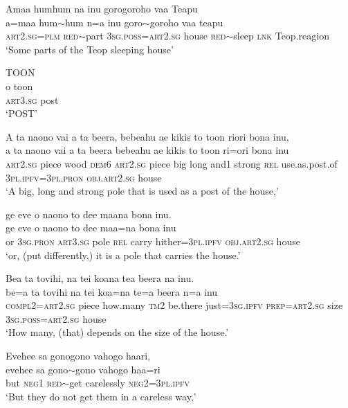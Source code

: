 \ea\label{ex:text11-1}
Amaa humhum na inu gorogoroho vaa Teapu\\
\gll a=maa	hum{$\sim$}hum	n=a	inu	goro{$\sim$}goroho	vaa	teapu\\
     \textsc{art}2.\textsc{sg}=\textsc{plm}	\textsc{red}{$\sim$}part	3\textsc{sg}.\textsc{poss}=\textsc{art}2.\textsc{sg}	house	\textsc{red}{$\sim$}sleep	\textsc{lnk}	Teop.reagion\\
\glt `Some parts of the Teop sleeping house'
\z

\ea\label{ex:text11-2}
TOON\\
\gll o	toon\\
     \textsc{art}3.\textsc{sg}	post\\
\glt `POST'
\z

\ea\label{ex:text11-3}
A ta naono vai a ta beera, bebeahu ae kikis to toon riori bona inu,\\
\gll a	ta	naono	vai	a	ta	beera	bebeahu	ae	kikis	to	toon	ri=ori	bona	inu\\
     \textsc{art}2.\textsc{sg}	piece	wood	\textsc{dem}6	\textsc{art}2.\textsc{sg}	piece	big	long	and1	strong	\textsc{rel}	use.as.post.of	3\textsc{pl}.\textsc{ipfv}=3\textsc{pl}.\textsc{pron}	\textsc{obj}.\textsc{art}2.\textsc{sg}	house\\
\glt `A big, long and strong pole that is used as a post of the house,'
\z

\ea\label{ex:text11-4}
ge eve o naono to dee maana bona inu.\\
\gll ge	eve	o	naono	to	dee	maa=na	bona	inu\\
     or	3\textsc{sg}.\textsc{pron}	\textsc{art}3.\textsc{sg}	pole	\textsc{rel}	carry	hither=3\textsc{pl}.\textsc{ipfv}	\textsc{obj}.\textsc{art}2.\textsc{sg}	house\\
\glt `or, (put differently,) it is a pole that carries the house.'
\z

\ea\label{ex:text11-5}
Bea ta tovihi, na tei koana tea beera na inu.\\
\gll be=a	ta	tovihi	na	tei	koa=na	te=a	beera	n=a	inu\\
     \textsc{compl}2=\textsc{art}2.\textsc{sg}	piece	how.many	\textsc{tm}2	be.there	just=3\textsc{sg}.\textsc{ipfv}	\textsc{prep}=\textsc{art}2.\textsc{sg}	size	3\textsc{sg}.\textsc{poss}=\textsc{art}2.\textsc{sg}	house\\
\glt `How many, (that) depends on the size of the house.'
\z

\ea\label{ex:text11-6}
Evehee sa gonogono vahogo haari,\\
\gll evehee	sa	gono{$\sim$}gono	vahogo	haa=ri\\
     but	\textsc{neg}1	\textsc{red}{$\sim$}get	carelessly	\textsc{neg}2=3\textsc{pl}.\textsc{ipfv}\\
\glt `But they do not get them in a careless way,'
\z

